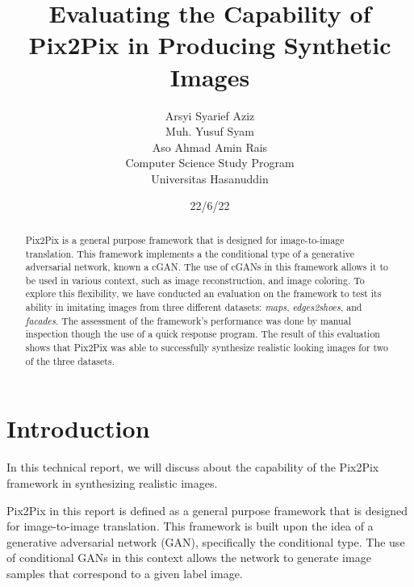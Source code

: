\documentclass[peerreview]{IEEEtran}
\begin{document}
\title{Evaluating the Capability of Pix2Pix in Producing Synthetic Images}



\author{Arsyi Syarief Aziz \\ Muh. Yusuf Syam \\ Aso Ahmad Amin Rais \\
Computer Science Study Program\\
Universitas Hasanuddin\\
}
\date{22/6/22}

\maketitle
\tableofcontents
\listoffigures
\listoftables

\IEEEpeerreviewmaketitle
\begin{abstract}
Pix2Pix is a general purpose framework that is designed for image-to-image translation. This framework implements a the conditional type of a generative adversarial network, known a cGAN. The use of cGANs in this framework allows it to be used in various context, such as image reconstruction, and image coloring. To explore this flexibility, we have conducted an evaluation on the framework to test its ability in imitating images from three different datasets: \textit{maps}, \textit{edges2shoes}, and \textit{facades}. The assessment of the framework's performance was done by manual inspection though the use of a quick response program. The result of this evaluation shows that Pix2Pix was able to successfully synthesize realistic looking images for two of the three datasets.

\end{abstract}

\section{Introduction}
In this technical report, we will discuss about the capability of the Pix2Pix framework in synthesizing realistic images.

Pix2Pix in this report is defined as a general purpose framework that is designed for image-to-image translation. This framework is built upon the idea of a generative adversarial network (GAN), specifically the conditional type. The use of conditional GANs in this context allows the network to generate image samples that correspond to a given label image. 
\end{document}
